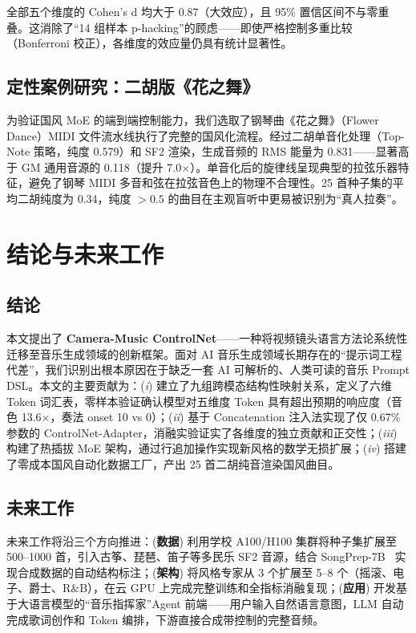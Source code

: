 \documentclass[UTF8,12pt,a4paper]{ctexart}
\begin{document}
全部五个维度的 Cohen's d 均大于 0.87（大效应），且 95\% 置信区间不与零重叠。这消除了“14 组样本 p-hacking”的顾虑——即使严格控制多重比较（Bonferroni 校正），各维度的效应量仍具有统计显著性。

\subsection{定性案例研究：二胡版《花之舞》}

为验证国风 MoE 的端到端控制能力，我们选取了钢琴曲《花之舞》（Flower Dance）MIDI 文件流水线执行了完整的国风化流程。经过二胡单音化处理（Top-Note 策略，纯度 0.579）和 SF2 渲染，生成音频的 RMS 能量为 0.831——显著高于 GM 通用音源的 0.118（提升 7.0$\times$）。单音化后的旋律线呈现典型的拉弦乐器特征，避免了钢琴 MIDI 多音和弦在拉弦音色上的物理不合理性。25 首种子集的平均二胡纯度为 0.34，纯度 $>0.5$ 的曲目在主观盲听中更易被识别为“真人拉奏”。


\section{结论与未来工作}

\subsection{结论}

本文提出了 \textbf{Camera-Music ControlNet}——一种将视频镜头语言方法论系统性迁移至音乐生成领域的创新框架。面对 AI 音乐生成领域长期存在的“提示词工程代差”，我们识别出根本原因在于缺乏一套 AI 可解析的、人类可读的音乐 Prompt DSL。本文的主要贡献为：(\textit{i}) 建立了九组跨模态结构性映射关系，定义了六维 Token 词汇表，零样本验证确认模型对五维度 Token 具有超出预期的响应度（音色 13.6$\times$，奏法 onset 10 vs 0）；(\textit{ii}) 基于 Concatenation 注入法实现了仅 0.67\% 参数的 ControlNet-Adapter，消融实验证实了各维度的独立贡献和正交性；(\textit{iii}) 构建了热插拔 MoE 架构，通过行追加操作实现新风格的数学无损扩展；(\textit{iv}) 搭建了零成本国风自动化数据工厂，产出 25 首二胡纯音渲染国风曲目。

\subsection{未来工作}

未来工作将沿三个方向推进：(\textbf{数据}) 利用学校 A100/H100 集群将种子集扩展至 500--1000 首，引入古筝、琵琶、笛子等多民乐 SF2 音源，结合 SongPrep-7B~\cite{songprep} 实现合成数据的自动结构标注；(\textbf{架构}) 将风格专家从 3 个扩展至 5--8 个（摇滚、电子、爵士、R\&B），在云 GPU 上完成完整训练和全指标消融复现；(\textbf{应用}) 开发基于大语言模型的“音乐指挥家”Agent 前端——用户输入自然语言意图，LLM 自动完成歌词创作和 Token 编排，下游直接合成带控制的完整音频。
\end{document}
